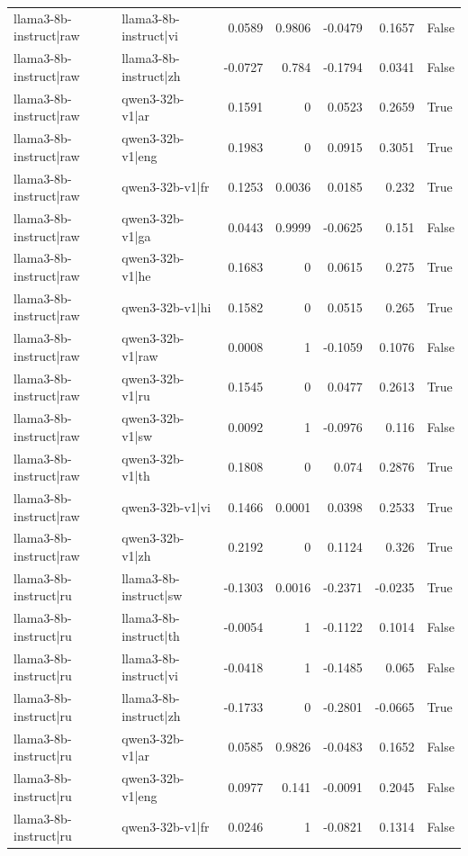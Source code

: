 \begin{table}
\begin{tabular}{l l r r r r l}
llama3-8b-instruct|raw & llama3-8b-instruct|vi & 0.0589 & 0.9806 & -0.0479 & 0.1657 & False \\
llama3-8b-instruct|raw & llama3-8b-instruct|zh & -0.0727 & 0.784 & -0.1794 & 0.0341 & False \\
llama3-8b-instruct|raw & qwen3-32b-v1|ar & 0.1591 & 0 & 0.0523 & 0.2659 & True \\
llama3-8b-instruct|raw & qwen3-32b-v1|eng & 0.1983 & 0 & 0.0915 & 0.3051 & True \\
llama3-8b-instruct|raw & qwen3-32b-v1|fr & 0.1253 & 0.0036 & 0.0185 & 0.232 & True \\
llama3-8b-instruct|raw & qwen3-32b-v1|ga & 0.0443 & 0.9999 & -0.0625 & 0.151 & False \\
llama3-8b-instruct|raw & qwen3-32b-v1|he & 0.1683 & 0 & 0.0615 & 0.275 & True \\
llama3-8b-instruct|raw & qwen3-32b-v1|hi & 0.1582 & 0 & 0.0515 & 0.265 & True \\
llama3-8b-instruct|raw & qwen3-32b-v1|raw & 0.0008 & 1 & -0.1059 & 0.1076 & False \\
llama3-8b-instruct|raw & qwen3-32b-v1|ru & 0.1545 & 0 & 0.0477 & 0.2613 & True \\
llama3-8b-instruct|raw & qwen3-32b-v1|sw & 0.0092 & 1 & -0.0976 & 0.116 & False \\
llama3-8b-instruct|raw & qwen3-32b-v1|th & 0.1808 & 0 & 0.074 & 0.2876 & True \\
llama3-8b-instruct|raw & qwen3-32b-v1|vi & 0.1466 & 0.0001 & 0.0398 & 0.2533 & True \\
llama3-8b-instruct|raw & qwen3-32b-v1|zh & 0.2192 & 0 & 0.1124 & 0.326 & True \\
llama3-8b-instruct|ru & llama3-8b-instruct|sw & -0.1303 & 0.0016 & -0.2371 & -0.0235 & True \\
llama3-8b-instruct|ru & llama3-8b-instruct|th & -0.0054 & 1 & -0.1122 & 0.1014 & False \\
llama3-8b-instruct|ru & llama3-8b-instruct|vi & -0.0418 & 1 & -0.1485 & 0.065 & False \\
llama3-8b-instruct|ru & llama3-8b-instruct|zh & -0.1733 & 0 & -0.2801 & -0.0665 & True \\
llama3-8b-instruct|ru & qwen3-32b-v1|ar & 0.0585 & 0.9826 & -0.0483 & 0.1652 & False \\
llama3-8b-instruct|ru & qwen3-32b-v1|eng & 0.0977 & 0.141 & -0.0091 & 0.2045 & False \\
llama3-8b-instruct|ru & qwen3-32b-v1|fr & 0.0246 & 1 & -0.0821 & 0.1314 & False \\

\end{tabular}
\end{table}
